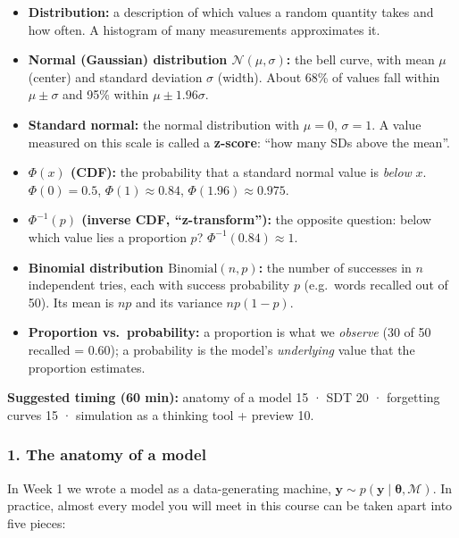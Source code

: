 \begin{itemize}
\tightlist
\item
  \textbf{Distribution:} a description of which values a random quantity
  takes and how often. A histogram of many measurements approximates it.
\item
  \textbf{Normal (Gaussian) distribution \(\mathcal{N}(\mu, \sigma)\):}
  the bell curve, with mean \(\mu\) (center) and standard deviation
  \(\sigma\) (width). About 68\% of values fall within
  \(\mu \pm \sigma\) and 95\% within \(\mu \pm 1.96\sigma\).
\item
  \textbf{Standard normal:} the normal distribution with \(\mu = 0\),
  \(\sigma = 1\). A value measured on this scale is called a
  \textbf{z-score}: ``how many SDs above the mean''.
\item
  \textbf{\(\Phi(x)\) (CDF):} the probability that a standard normal
  value is \emph{below} \(x\). \(\Phi(0) = 0.5\),
  \(\Phi(1) \approx 0.84\), \(\Phi(1.96) \approx 0.975\).
\item
  \textbf{\(\Phi^{-1}(p)\) (inverse CDF, ``z-transform''):} the opposite
  question: below which value lies a proportion \(p\)?
  \(\Phi^{-1}(0.84) \approx 1\).
\item
  \textbf{Binomial distribution \(\mathrm{Binomial}(n, p)\):} the number
  of successes in \(n\) independent tries, each with success probability
  \(p\) (e.g.~words recalled out of 50). Its mean is \(np\) and its
  variance \(np(1-p)\).
\item
  \textbf{Proportion vs.~probability:} a proportion is what we
  \emph{observe} (30 of 50 recalled = 0.60); a probability is the
  model's \emph{underlying} value that the proportion estimates.
\end{itemize}

\textbf{Suggested timing (60 min):} anatomy of a model 15 · SDT 20 ·
forgetting curves 15 · simulation as a thinking tool + preview 10.

\subsubsection{1. The anatomy of a model}

In Week 1 we wrote a model as a data-generating machine,
\(\mathbf{y} \sim p(\mathbf{y}\mid\boldsymbol\theta, \mathcal{M})\). In
practice, almost every model you will meet in this course can be taken
apart into five pieces:

